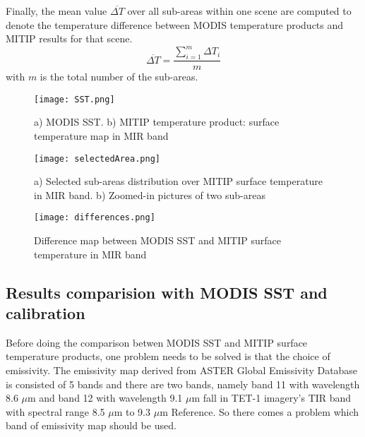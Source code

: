\noindent Finally, the mean value $\overline{\Delta T}$ over all sub-areas within one scene are computed to denote the temperature difference between MODIS temperature products and MITIP results for that scene.\\
\begin{equation}
\label{eq1}
\overline{\Delta T} =\frac{\sum_{i=1}^m \Delta T_i}{m}
\end{equation}
with $m$ is the total number of the sub-areas.

\begin{figure}[!htbp]
\centering\texttt{[image: SST.png]}
\caption{a) MODIS SST. b) MITIP temperature product: surface temperature map in MIR band}
\label{fig:SST}

\centering\texttt{[image: selectedArea.png]}
\caption{a) Selected sub-areas distribution over MITIP surface temperature in MIR band. b) Zoomed-in pictures of two sub-areas}
\label{fig:selectedArea}
\end{figure}

\begin{figure}[!htbp]
\centering\texttt{[image: differences.png]}
\caption{Difference map between MODIS SST and MITIP surface temperature in MIR band}
\label{fig:Diff}
\end{figure}


\subsection{Results comparision with MODIS SST and calibration}
Before doing the comparison betwen MODIS SST and MITIP surface temperature products, one problem needs to be solved is that the choice of emissivity. The emissivity map derived from ASTER Global Emissivity Database is consisted of 5 bands and there are two bands, namely band 11 with wavelength 8.6 $\mu$m and band 12 with wavelength 9.1 $\mu$m fall in TET-1 imagery's TIR band with spectral range 8.5 $\mu$m to 9.3 $\mu$m {Reference}. So there comes a problem which band of emissivity map should be used.



